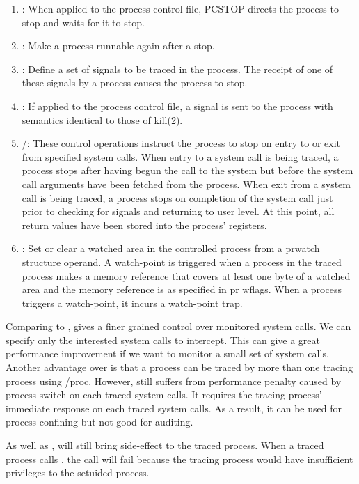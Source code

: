 \begin{enumerate}
\item {}: When applied to the process control file, PCSTOP directs
the process to stop and waits for it to stop.
\item {}: Make a process runnable
again after a stop. 
\item {}: Define a set of signals to be traced in the
process. The receipt of one of these signals by a process causes the process to
stop.
\item {}: If applied to the process control file, a signal is sent to
the process with semantics identical to those of kill(2).
\item {}/:
These control operations instruct the process to stop on entry to or exit from
specified system calls. When entry to a system call is being traced, a process
stops after having begun the call to the system but before the system call
arguments have been fetched from the process. When exit from a system call is
being traced, a process stops on completion of the system call just prior to
checking for signals and returning to user level. At this point, all return
values have been stored into the process' registers.
\item {}: Set or clear a
watched area in the controlled process from a prwatch structure operand. A
watch-point is triggered when a process in the traced process makes a memory
reference that covers at least one byte of a watched area and the memory
reference is as specified in pr wflags. When a process triggers a watch-point,
it incurs a watch-point trap.
\end{enumerate}

Comparing to ,  gives a finer
grained control over monitored system calls. We can specify only the interested
system calls to intercept. This can give a great performance improvement if we
want to monitor a small set of system calls. Another advantage over 
is that a process can be traced by more than one tracing process using /proc.
However,  still suffers from performance penalty caused by process switch
on each traced system calls. It requires the tracing process' immediate
response on each traced system calls. As a result, it can be used for process
confining but not good for auditing.

As well as ,  will still
bring side-effect to the traced process. When a traced process calls ,
the call will fail because the tracing process would have insufficient
privileges to the setuided process.

